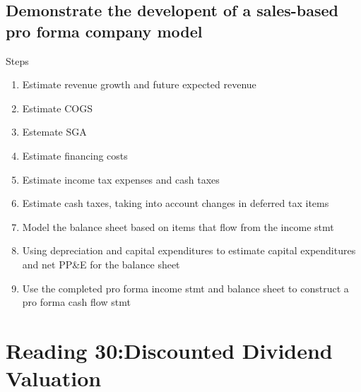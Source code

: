 \documentclass{article}
\newcommand{\be}{\begin{enumerate}}
\newcommand{\ee}{\end{enumerate}}
\begin{document}
\subsection{Demonstrate the developent of a sales-based pro forma company model}
Steps
\be
    \item Estimate revenue growth and future expected revenue
    \item Estimate COGS
    \item Estemate SGA
    \item Estimate financing costs
    \item Estimate income tax expenses and cash taxes
    \item Estimate cash taxes, taking into account changes in deferred tax items
    \item Model the balance sheet based on items that flow from the income stmt
    \item Using depreciation and capital expenditures to estimate capital
        expenditures and net PP\&E for the balance sheet
    \item Use the completed pro forma income stmt and balance sheet
        to construct a pro forma cash flow stmt
\ee

\section{Reading 30:Discounted Dividend Valuation}
\end{document}
